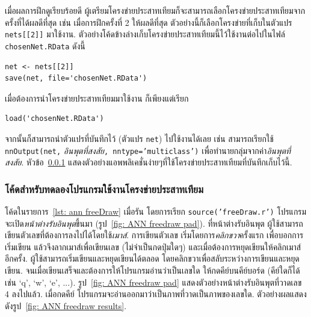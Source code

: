เมื่อผลการฝึกดูเรียบร้อยดี ผู้เตรียมโครงข่ายประสาทเทียมก็จะสามารถเลือกโครงข่ายประสาทเทียมจากครั้งที่ได้ผลดีที่สุด 
เช่น เมื่อการฝึกครั้งที่ 2 ให้ผลดีที่สุด ตัวอย่างนี้ก็เลือกโครงข่ายที่เก็บในตัวแปร \texttt{nets[[2]]} มาใช้งาน. 
ตัวอย่างโค้ดข้างล่างเก็บโครงข่ายประสาทเทียมนี้ไว้ใช้งานต่อไปในไฟล์ \texttt{chosenNet.RData} ดังนี้
\begin{verbatim}
net <- nets[[2]]
save(net, file='chosenNet.RData')
\end{verbatim}

เมื่อต้องการนำโครงข่ายประสาทเทียมมาใช้งาน ก็เพียงแต่เรียก
\begin{verbatim}
load('chosenNet.RData')
\end{verbatim}

จากนั้นก็สามารถนำตัวแปรที่บันทึกไว้ (ตัวแปร \texttt{net}) ไปใช้งานได้เลย 
เช่น สามารถเรียกใช้ \texttt{nnOutput(net,} {\small \textit{อินพุตที่สงสัย}}\texttt{, nntype='multiclass')} เพื่อทำนายกลุ่มจากค่า{\small \textit{อินพุตที่สงสัย}}.
หัวข้อ~\ref{sec: ann app freedraw} แสดงตัวอย่างแอพพลิเคชั่นง่ายๆที่ใช้โครงข่ายประสาทเทียมที่บันทึกเก็บไว้นี้.

\subsubsection{โค้ดสำหรับทดลองโปรแกรมใช้งานโครงข่ายประสาทเทียม}
\label{sec: ann app freedraw}

โค้ดในรายการ~\ref{lst: ann freeDraw} เมื่อรัน โดยการเรียก \texttt{source('freeDraw.r')} โปรแกรมจะเปิด\textit{หน้าต่างรับอินพุต}ขึ้นมา (รูป~\ref{fig: ANN freedraw pad}).
ที่หน้าต่างรับอินพุต ผู้ใช้สามารถเขียนตัวเลขที่ต้องการลงไปได้โดยใช้\textit{เมาส์}.
การเขียนตัวเลข เริ่มโดยการ\textit{คลิกขวา}ครั้งแรก เพื่อบอกการเริ่มเขียน 
แล้วจึงลากเมาส์เพื่อเขียนเลข (ไม่จำเป็นกดปุ่มใดๆ)
และเมื่อต้องการหยุดเขียนให้คลิกเมาส์อีกครั้ง. 
ผู้ใช้สามารถเริ่มเขียนและหยุดเขียนได้ตลอด โดยคลิกขวาเพื่อสลับระหว่างการเขียนและหยุดเขียน.
จนเมื่อเขียนเสร็จและต้องการให้โปรแกรมอ่านว่าเป็นเลขใด ให้กดคีย์บนคีย์บอร์ด (คีย์ใดก็ได้ เช่น `q', `w', `e', ...).
รูป~\ref{fig: ANN freedraw pad} แสดงตัวอย่างหน้าต่างรับอินพุตที่วาดเลข 4 ลงไปแล้ว.
เมื่อกดคีย์ โปรแกรมจะอ่านออกมาว่าเป็นภาพที่วาดเป็นภาพของเลขใด.
ตัวอย่างผลแสดงดังรูป~\ref{fig: ANN freedraw results}.

